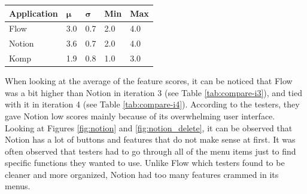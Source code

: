 			\begin{table}[!htpb]
			  \centering
			   \label{tab:app-usability-scores}
			  \begin{tabular}{|p{3cm}|R{1cm}|R{1cm}|R{1cm}|R{1cm}|}
			  	\hline
			  	\textbf{Application} & \begin{math}\bm{\mu}\end{math} & \begin{math}\bm{\sigma}\end{math} & \textbf{Min} & \textbf{Max} \\ \hline

			  	Flow 	& 3.0 & 0.7 & 2.0 & 4.0 \\ \hline
			  	Notion 	& 3.6 & 0.7 & 2.0 & 4.0 \\ \hline 
			  	Komp 	& 1.9 & 0.8 & 1.0 & 3.0 \\ \hline
				
			  \end{tabular}
			\end{table}


			When looking at the average of the feature scores, it can be noticed that Flow was a bit higher than Notion in iteration 3 (see Table \ref{tab:compare-i3}), and tied with it in iteration 4 (see Table \ref{tab:compare-i4}). According to the testers, they gave Notion low scores mainly because of its overwhelming user interface. Looking at Figures \ref{fig:notion} and \ref{fig:notion_delete}, it can be observed that Notion has a lot of buttons and features that do not make sense at first. It was often observed that testers had to go through all of the menu items just to find specific functions they wanted to use. Unlike Flow which testers found to be cleaner and more organized, Notion had too many features crammed in its menus. 

